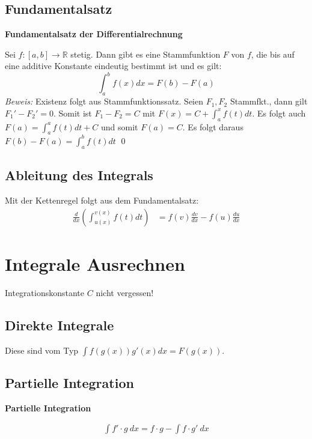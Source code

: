 \documentclass[25pt]{sciposter}
\newcommand{\R}{\mathbb{R}}
\newenvironment{method}[1]{\begin{mdframed}[backgroundcolor=blue!10,innertopmargin=15pt, innerbottommargin=15pt,nobreak=true]
		\textbf{#1 }
	}
	{ 
	\end{mdframed}
}
\newenvironment{important}{\begin{mdframed}[backgroundcolor=red!50,innertopmargin=15pt, innerbottommargin=15pt, nobreak=true]
		\Large
	}
	{ 
	\end{mdframed}
}
\begin{document}
\begin{multicols}{3}
\begin{itemize}
			
		\end{itemize}
		
		
		
		
		
		
		\subsection*{Fundamentalsatz}
		
		\begin{method}{Fundamentalsatz der Differentialrechnung}
			Sei $f:[a,b] \to \R$ stetig. Dann gibt es eine Stammfunktion $F$ von $f$, die bis auf eine additive Konstante eindeutig bestimmt ist und es gilt:
			$$\int_{a}^{b} f(x) dx = F(b) - F(a)$$
			\textit{Beweis:} Existenz folgt aus Stammfunktionssatz. Seien $F_1, F_2$ Stammfkt., dann gilt $F_1' - F_2' = 0$. Somit ist $F_1 - F_2 = C$ mit $F(x) = C + \int_{a}^{x} f(t) dt$. Es folgt auch $F(a) = \int_{a}^{a} f(t) dt + C$ und somit $F(a) = C$. Es folgt daraus $F(b)-F(a) = \int_{a}^{b} f(t) dt$ \qed 
		\end{method}
		
		
		\subsection*{Ableitung des Integrals}
		Mit der Kettenregel folgt aus dem Fundamentalsatz:
		\begin{align*}
			\frac{d}{dx} \left( \int_{u(x)}^{v(x)} f(t)  dt \right) &= f(v)\frac{dv}{dx} - f(u)\frac{du}{dx}
		\end{align*}
		
		\section*{Integrale Ausrechnen}
		
		\begin{important}
			Integrationskonstante $C$ nicht vergessen!
		\end{important}
		
		\subsection*{Direkte Integrale}
		Diese sind vom Typ $\int f(g(x)) g'(x) dx = F(g(x))$.
		
		\subsection*{Partielle Integration}
		\begin{method}{Partielle Integration}
			\begin{align*}
				\int f' \cdot g \ dx = f \cdot g - \int f \cdot g' \  dx
			\end{align*}
		\end{method}
		

\end{multicols}
\end{document}

